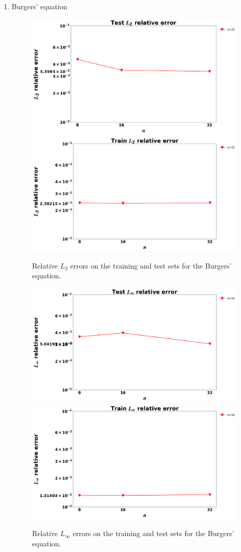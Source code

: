 \documentclass[11pt, fullpage,letterpaper]{article}
\begin{document}
\begin{enumerate}

\item Burgers' equation
\begin{figure}[h]
    \centering
    \includegraphics[width=0.5\linewidth]{all_plots/Burgers/test_l2_vs_size.png} 
    \includegraphics[width=0.5\linewidth]{all_plots/Burgers/train_l2_vs_size.png} 
    \caption{Relative $L_2$ errors on the training and test sets for the Burgers' equation.}
    \label{fig:burgers_l2}
\end{figure}

\begin{figure}[h]
    \centering
    \includegraphics[width=0.5\linewidth]{all_plots/Burgers/test_linf_vs_size.png} 
    \includegraphics[width=0.5\linewidth]{all_plots/Burgers/train_linf_vs_size.png} 
    \caption{Relative $L_\infty$ errors on the training and test sets for the Burgers' equation.}
    \label{fig:burgers_linf}
\end{figure}


\end{enumerate}
\end{document}
